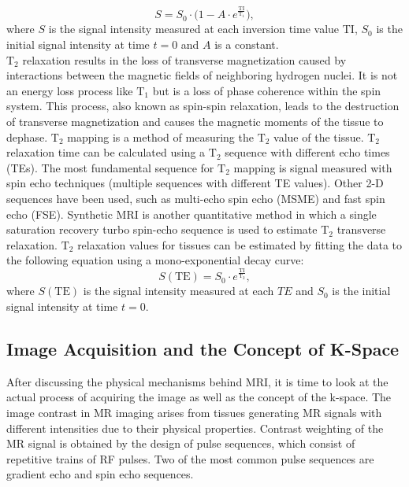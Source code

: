 \begin{equation}
	S = S_0 \cdot \bigg(1 - A \cdot e^{\frac{\text{TI}}{\text{T}_1}} \bigg),
\end{equation}
where $S$ is the signal intensity measured at each inversion time value $\text{TI}$, $S_0$ is the initial signal intensity at time $t=0$ and $A$ is
a constant.\\
$\text{T}_2$ relaxation results in the loss of transverse magnetization caused by interactions between the magnetic fields of neighboring hydrogen nuclei. It is not an energy loss process like $\text{T}_1$ but is a loss of phase coherence within the spin system. This process, also known as spin-spin relaxation, leads to the destruction of transverse magnetization and causes the magnetic moments of the tissue to dephase. $\text{T}_2$ mapping is a method of measuring the $\text{T}_2$ value of the tissue. $\text{T}_2$ relaxation time can be calculated using a $\text{T}_2$ sequence with different echo times (TEs). The most fundamental sequence for $\text{T}_2$ mapping is signal measured with spin echo techniques (multiple sequences with different TE values). Other 2-D sequences have been used, such as multi-echo spin echo (MSME) and fast spin echo (FSE). Synthetic MRI is another quantitative method in which a single saturation recovery turbo spin-echo sequence is used to estimate $\text{T}_2$ transverse relaxation. $\text{T}_2$ relaxation values for tissues can be estimated by fitting the data to the following equation using a mono-exponential decay curve:
\begin{equation}
	S(\text{TE}) = S_0 \cdot e^{\frac{\text{TI}}{\text{T}_2}},
\end{equation}
where $S(\text{TE})$ is the signal intensity measured at each $TE$ and
$S_0$ is the initial signal intensity at time $t=0$.

\subsection{Image Acquisition and the Concept of K-Space} \label{SubSec:ImageAcquisitionAndK-Space}
After discussing the physical mechanisms behind MRI, it is time to look at the actual process of acquiring the image as well as the concept of the k-space. 
The image contrast in MR imaging arises from tissues generating MR signals with different intensities due to their physical properties. Contrast weighting of the MR signal is obtained by the design of pulse sequences, which consist of repetitive trains of RF pulses. Two of the most common pulse sequences are gradient echo 
and spin echo 
sequences. %

